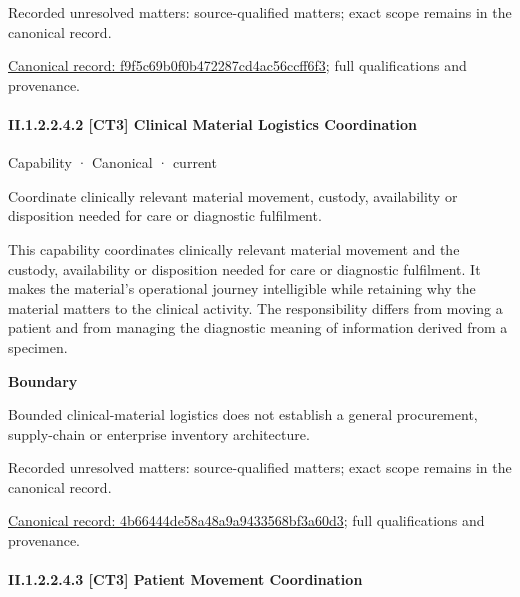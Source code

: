 {\small Recorded unresolved matters: source-qualified matters; exact scope remains in the canonical record.}\par
{\footnotesize \href{../../../../continuum/strategy/capability/f9f5c69b0f0b472287cd4ac56ccff6f3.md}{Canonical record: f9f5c69b0f0b472287cd4ac56ccff6f3}; full qualifications and provenance.}\par
\paragraph*{II.1.2.2.4.2 [CT3] Clinical Material Logistics Coordination}
\label{navigation:II.1.2.2.4.2}

\label{element:4b66444de58a48a9a9433568bf3a60d3}
{\small Capability · Canonical · current}\par

Coordinate clinically relevant material movement, custody, availability or disposition needed for care or diagnostic fulfilment.



This capability coordinates clinically relevant material movement and the custody, availability or disposition needed for care or diagnostic fulfilment. It makes the material's operational journey intelligible while retaining why the material matters to the clinical activity. The responsibility differs from moving a patient and from managing the diagnostic meaning of information derived from a specimen.



\textbf{Boundary}



Bounded clinical-material logistics does not establish a general procurement, supply-chain or enterprise inventory architecture.


{\small Recorded unresolved matters: source-qualified matters; exact scope remains in the canonical record.}\par
{\footnotesize \href{../../../../continuum/strategy/capability/4b66444de58a48a9a9433568bf3a60d3.md}{Canonical record: 4b66444de58a48a9a9433568bf3a60d3}; full qualifications and provenance.}\par
\paragraph*{II.1.2.2.4.3 [CT3] Patient Movement Coordination}
\label{navigation:II.1.2.2.4.3}

